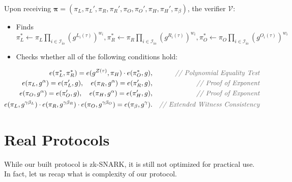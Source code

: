 \documentclass[../lecture-notes.tex]{subfiles}
\begin{document}
\begin{tcolorbox}
    Upon receiving $\boldsymbol{\pi} = (\pi_L,\pi_L',\pi_R,\pi_R',\pi_O,\pi_O',\pi_H,\pi_H',\pi_{\beta})$, the verifier $\mathcal{V}$:
    \begin{itemize}[label=]
        \item Finds $\pi_L^* \gets \pi_L\prod_{i \in \mathcal{I}_{\text{io}}} (g^{L_i(\tau)})^{w_i},\pi_R^* \gets \pi_R\prod_{i \in \mathcal{I}_{\text{io}}} (g^{R_i(\tau)})^{w_i},\pi_O^* \gets \pi_O\prod_{i \in \mathcal{I}_{\text{io}}} (g^{O_i(\tau)})^{w_i}$
        \item Checks whether all of the following conditions hold:
    \end{itemize}
    \begin{align*}
        e(\pi_L^*, \pi_R^*) = e(g^{Z(\tau)}, \pi_H) \cdot e(\pi_O^*, g),&& \textcolor{gray!80!black}{\textit{// Polynomial Equality Test}} \\
        e(\pi_L, g^{\alpha}) = e(\pi_L', g), \quad e(\pi_R, g^{\alpha}) = e(\pi_R', g),&& \textcolor{gray!80!black}{\textit{// Proof of Exponent}} \\
        e(\pi_O, g^{\alpha}) = e(\pi_O', g), \quad e(\pi_H, g^{\alpha}) = e(\pi_H', g),&& \textcolor{gray!80!black}{\textit{// Proof of Exponent}} \\
        e(\pi_L, g^{\gamma\beta_L}) \cdot e(\pi_R, g^{\gamma\beta_R}) \cdot e(\pi_O, g^{\gamma\beta_O}) = e(\pi_{\beta}, g^{\gamma}).&& \textcolor{gray!80!black}{\textit{// Extended Witness Consistency}}
    \end{align*}
\end{tcolorbox}

\section{Real Protocols}

While our built protocol is zk-SNARK, it is still not optimized for practical use. In fact, let us recap what is complexity of our protocol.
\end{document}

